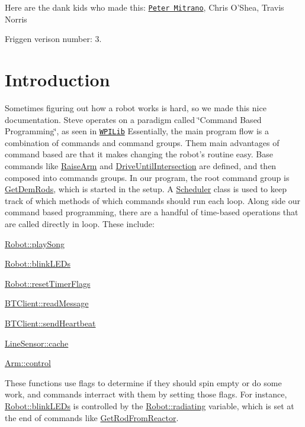 Here are the dank kids who made this\-:  \href{https://petermitrano.github.io}{\tt Peter Mitrano},  Chris O'Shea,  Travis Norris

Friggen verison number\-:  3.\hypertarget{index_Introduction}{}\section{Introduction}\label{index_Introduction}
Sometimes figuring out how a robot works is hard, so we made this nice documentation. Steve operates on a paradigm called \char`\"{}\-Command Based Programming\char`\"{}, as seen in \href{https://wpilib.screenstepslive.com/s/4485/m/13809/l/241892-what-is-command-based-programming}{\tt W\-P\-I\-Lib} Essentially, the main program flow is a combination of commands and command groups. Them main advantages of command based are that it makes changing the robot's routine easy. Base commands like \hyperlink{classRaiseArm}{Raise\-Arm} and \hyperlink{classDriveUntilIntersection}{Drive\-Until\-Intersection} are defined, and then composed into commands groups. In our program, the root command group is \hyperlink{classGetDemRods}{Get\-Dem\-Rods}, which is started in the setup. A \hyperlink{classScheduler}{Scheduler} class is used to keep track of which methods of which commands should run each loop. Along side our command based programming, there are a handful of time-\/based operations that are called directly in loop. These include\-:
\begin{DoxyItemize}
\item \hyperlink{classRobot_ad86dbbb2ad0d065f3e4c30fd4b742e1c}{Robot\-::play\-Song}
\item \hyperlink{classRobot_a4215f7e880311c2118f387df75effaf2}{Robot\-::blink\-L\-E\-Ds}
\item \hyperlink{classRobot_ab7c87529c987ede12b934bdfc768507e}{Robot\-::reset\-Timer\-Flags}
\item \hyperlink{classBTClient_a8e827d16926d45a4b7c18dda0e59837b}{B\-T\-Client\-::read\-Message}
\item \hyperlink{classBTClient_a4bf8f58f2c83834cab585e69c55c171f}{B\-T\-Client\-::send\-Heartbeat}
\item \hyperlink{classLineSensor_afc809d2aa49426d949f76f68b0154050}{Line\-Sensor\-::cache}
\item \hyperlink{classArm_a009c19e5b213f692c24eab792cc40c47}{Arm\-::control}
\end{DoxyItemize}

These functions use flags to determine if they should spin empty or do some work, and commands interract with them by setting those flags. For instance, \hyperlink{classRobot_a4215f7e880311c2118f387df75effaf2}{Robot\-::blink\-L\-E\-Ds} is controlled by the \hyperlink{classRobot_a77f62d85ab1cf34e79c2a3acd470a4ce}{Robot\-::radiating} variable, which is set at the end of commands like \hyperlink{classGetRodFromReactor}{Get\-Rod\-From\-Reactor}. 